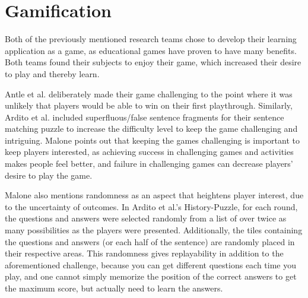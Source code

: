 
\section{Gamification}

Both of the previously mentioned research teams chose to develop their learning application as a game, as educational games have proven to have many benefits\citep{Ardito}. Both teams found their subjects to enjoy their game, which increased their desire to play and thereby learn.

Antle et al. deliberately made their game challenging to the point where it was unlikely that players would be able to win on their first playthrough. Similarly, Ardito et al. included superfluous/false sentence fragments for their sentence matching puzzle to increase the difficulty level to keep the game challenging and intriguing. Malone\citep{Malone} points out that keeping the games challenging is important to keep players interested, as achieving success in challenging games and activities makes people feel better, and failure in challenging games can decrease players' desire to play the game.

Malone also mentions randomness as an aspect that heightens player interest, due to the uncertainty of outcomes. In Ardito et al.'s History-Puzzle, for each round, the questions and answers were selected randomly from a list of over twice as many possibilities as the players were presented. Additionally, the tiles containing the questions and answers (or each half of the sentence) are randomly placed in their respective areas. This randomness gives replayability in addition to the aforementioned challenge, because you can get different questions each time you play, and one cannot simply memorize the position of the correct answers to get the maximum score, but actually need to learn the answers.